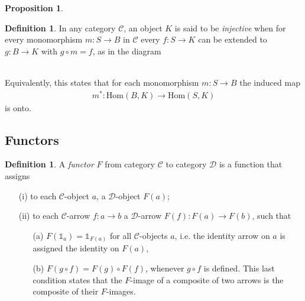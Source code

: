 \documentclass[10]{article}
\theoremstyle{plain}
\newtheorem{proposition}[prop]{Proposition}
\theoremstyle{definition}
\theoremstyle{definition}
\newtheorem{definition}[prop]{Definition}
\numberwithin{equation}{section}
\newcommand{\7}{\dagger}                     %
\newcommand{\8}{\bullet}                     %
\renewcommand{\.}{\cdot}                     %
\renewcommand{\:}{\colon}                    %
\renewcommand{\:}{\colon}           %
\newcommand{\Hom}{\mathrm{Hom}}       %
\newcommand{\bean}{\begin{eqnarray*}}
\newcommand{\eean}{\end{eqnarray*}}
\begin{document}
\begin{appendices}
\begin{proposition}
\begin{enumerate}
					
				\end{enumerate}
			\end{proposition}
			
			\begin{definition}\label{injective_object_defn}\cite{topos:intro}
				In any category $\mathscr C$, an object $K$ is said to be \textit{injective} when for
				every monomorphism $m: S \to B$ in $\mathscr C$ every $f: S\to K$ can be extended
				to $g: B \to K$ with $g\circ m = f$, as in the diagram
				\newline
				\\
				Equivalently, this states that for each monomorphism $m: S \to B$ the
				induced map
				\bean
				m^*: \Hom( B, K) \to \Hom( S, K) 
				\eean
				is onto. 	
			\end{definition}
			\subsection{Functors}
			\begin{definition}\label{functor_defn}\cite{goldblatt:topoi}
				A \textit{functor} $F$ from category $\mathscr{C}$ to category $\mathscr{D}$ is a function that assigns 
				\begin{enumerate}
					\item [(i)]
					to each $\mathscr{C}$-object $a$, a $\mathscr{D}$-object $F(a)$; 
					\item[(ii)] to each $\mathscr{C}$-arrow $f:a \to b$ a $\mathscr{D}$-arrow $F(f): F(a) \to F(b)$, 
					such that 
					\begin{enumerate}
						\item[(a)]  $F\left(\mathbb 1_a\right) = \mathbb 1_{F\left(a\right)}$ for all  $\mathscr{C}$-objects $a$, i.e. the identity arrow on $a$ is assigned 
						the identity on $F\left(a\right)$,
						\item[(b)]  $F\left(g\circ f\right)=F\left(g\right)\circ F\left( f\right) $, whenever $g \circ f$ is defined. 
						This last condition states that the $F$-image of a composite of two arrows 
						is the composite of their $F$-images.
					\end{enumerate}
					

\end{enumerate}
\end{definition}
\end{appendices}
\end{document}

